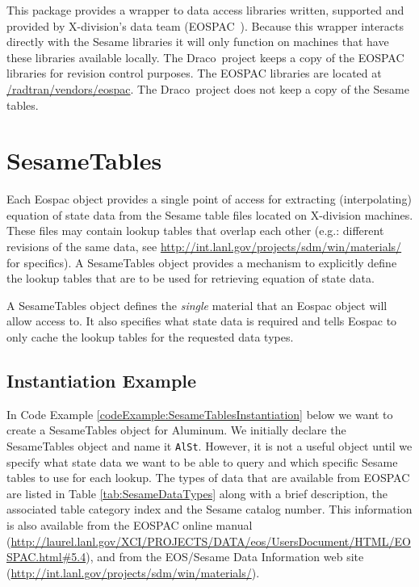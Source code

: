 \documentclass[11pt]{nmemo}
\newcommand{\draco}{{\normalfont\sffamily Draco}}
\begin{document}
This package provides a wrapper to data access libraries written,
supported and provided by X-division's data team
(EOSPAC~\cite{eospac-cranfill,eospac-web-site}).  Because this wrapper
interacts directly with the Sesame libraries it will only function on
machines that have these libraries available locally. The \draco\
project keeps a copy of the EOSPAC libraries for revision control
purposes.  The EOSPAC libraries are located at
\url{/radtran/vendors/eospac}.  The \draco\ project does not keep a
copy of the Sesame tables.



\section{SesameTables}
\label{SesameTables}

Each Eospac object provides a single point of access for extracting
(interpolating) equation of state data from the Sesame table files
located on X-division machines.  These files may contain lookup
tables that overlap each other (e.g.: different revisions of the same
data, see \url{http://int.lanl.gov/projects/sdm/win/materials/} for
specifics).  A SesameTables object provides a mechanism to explicitly
define the lookup tables that are to be used for retrieving equation
of state data.

A SesameTables object defines the \emph{single} material that an
Eospac object will allow access to.  It also specifies what state data
is required and tells Eospac to only cache the lookup tables for the
requested data types.


\subsection{Instantiation Example}

In Code Example \ref{codeExample:SesameTablesInstantiation} below we
want to create a SesameTables object for Aluminum.  We initially
declare the SesameTables object and name it \texttt{AlSt}.  However,
it is not a useful object until we specify what state data we want to
be able to query and which specific Sesame tables to use for each
lookup.  The types of data that are available from EOSPAC are listed
in Table \ref{tab:SesameDataTypes} along with a brief description, the
associated table category index and the Sesame catalog number.  This
information is also available from the EOSPAC online manual
(\url{http://laurel.lanl.gov/XCI/PROJECTS/DATA/eos/UsersDocument/HTML/EOSPAC.html#5.4}),
and from the EOS/Sesame Data Information web site
(\url{http://int.lanl.gov/projects/sdm/win/materials/}).
\end{document}
